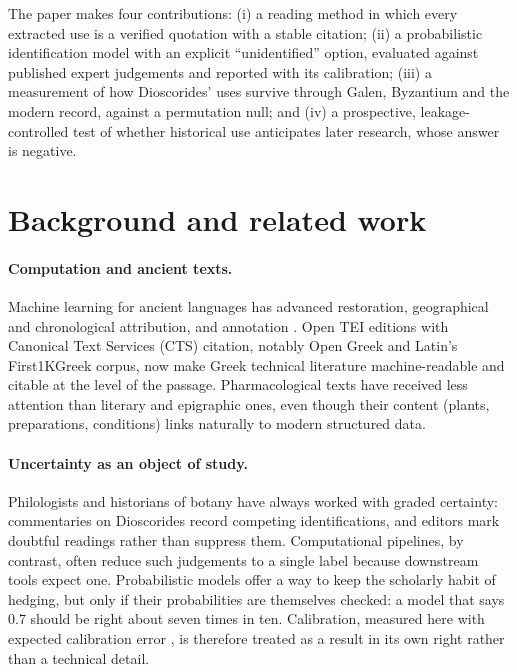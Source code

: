 \documentclass[11pt,a4paper]{article}
\begin{document}
The paper makes four contributions: (i) a reading method in which every extracted use is a verified quotation with a stable citation; (ii) a probabilistic identification model with an explicit “unidentified” option, evaluated against published expert judgements and reported with its calibration; (iii) a measurement of how Dioscorides’ uses survive through Galen, Byzantium and the modern record, against a permutation null; and (iv) a prospective, leakage-controlled test of whether historical use anticipates later research, whose answer is negative.

\section{Background and related work}

\paragraph{Computation and ancient texts.} Machine learning for ancient languages has advanced restoration, geographical and chronological attribution, and annotation \citep{assael2022ithaca,sommerschield2023}. Open TEI editions with Canonical Text Services (CTS) citation, notably Open Greek and Latin’s First1KGreek corpus, now make Greek technical literature machine-readable and citable at the level of the passage. Pharmacological texts have received less attention than literary and epigraphic ones, even though their content (plants, preparations, conditions) links naturally to modern structured data.

\paragraph{Uncertainty as an object of study.} Philologists and historians of botany have always worked with graded certainty: commentaries on Dioscorides record competing identifications, and editors mark doubtful readings rather than suppress them. Computational pipelines, by contrast, often reduce such judgements to a single label because downstream tools expect one. Probabilistic models offer a way to keep the scholarly habit of hedging, but only if their probabilities are themselves checked: a model that says 0.7 should be right about seven times in ten. Calibration, measured here with expected calibration error \citep{naeini2015}, is therefore treated as a result in its own right rather than a technical detail.
\end{document}
